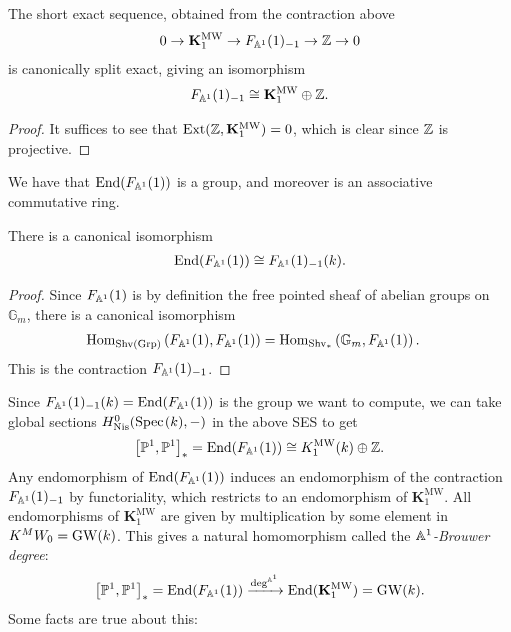 \documentclass[11pt,openany]{book}
\providecommand{\MW}{\mathrm{MW}}
\providecommand{\KMW}{\mathbf{K}^\mathrm{MW}}
\begin{document}
\begin{proposition} The short exact sequence, obtained from the contraction above
\begin{align*}
    0 \to \KMW_1 \to F_{\A^1}(1)_{-1} \to \Z \to 0
\end{align*}
is canonically split exact, giving an isomorphism
\begin{align*}
    F_{\A^1}(1)_{-1} \cong \KMW_1 \oplus \Z.
\end{align*}
\end{proposition}
\begin{proof} It suffices to see that $\Ext(\Z, \KMW_1) = 0$, which is clear since $\mathbb{Z}$ is projective.
\end{proof}

\begin{proposition} We have that $\mathrm{End}(F_{\mathbb{A}^1}(1))$ is a group, and moreover is an associative commutative ring.
\end{proposition}

\begin{proposition}\label{prop:end-FA1-global-sections-contraction} 
There is a canonical isomorphism
\begin{align*}
    \mathrm{End}(F_{\mathbb{A}^1}(1)) \cong F_{\mathbb{A}^1}(1)_{-1}(k).
\end{align*}
\end{proposition}
\begin{proof} Since $F_{\mathbb{A}^1}(1)$ is by definition the free pointed sheaf of abelian groups on $\mathbb{G}_m$, there is a canonical isomorphism
\begin{align*}
    \mathrm{Hom}_{\mathrm{Shv}(\mathrm{Grp})} \left( F_{\mathbb{A}^1}(1), F_{\mathbb{A}^1}(1) \right) &= \mathrm{Hom}_{\mathrm{Shv}_\ast} \left( \mathbb{G}_m, F_{\mathbb{A}^1}(1) \right).
\end{align*}
This is the contraction $F_{\mathbb{A}^1}(1)_{-1}$.
\end{proof}



Since $F_{\mathbb{A}^1}(1)_{-1}(k) = \mathrm{End}(F_{\mathbb{A}^1}(1))$ is the group we want to compute, we can take global sections $H^0_{\mathrm{Nis}}(\text{Spec}\hspace{0.1em}(k),-)$ in the above SES to get
\begin{equation}\label{eqn:global-sections-speck-fa1-contracted}
\begin{aligned}
    \left[ \P^1,\P^1 \right]_\ast = \End (F_{\A^1}(1)) \cong K_1^\MW(k) \oplus \Z.
\end{aligned}
\end{equation}
%
Any endomorphism of $\mathrm{End}(F_{\mathbb{A}^1}(1))$ induces an endomorphism of the contraction $F_{\mathbb{A}^1}(1)_{-1}$ by functoriality, which restricts to an endomorphism of $\KMW_1$. All endomorphisms of $\KMW_1$ are given by multiplication by some element in $K^MW_0 = \mathrm{GW}(k)$. This gives a natural homomorphism called the \textit{$\mathbb{A}^1$-Brouwer degree}:
\begin{align*}
    \left[ \P^1,\P^1 \right]_\ast = \End(F_{\A^1}(1)) \xto{\deg^{\A^1}} \End(\KMW_1) = \GW(k).
\end{align*}
%
Some facts are true about this:
\end{document}
